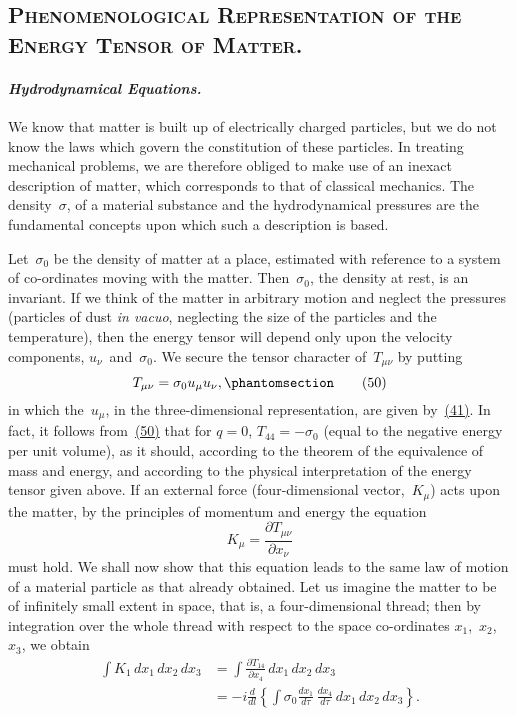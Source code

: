 \documentclass[12pt]{book}[2005/09/16]
\newcommand{\Section}[1]{%
  \subsection*{\centering\normalfont\large\textsc{#1}}
}
\newcommand{\Paragraph}[1]{\paragraph*{\indent\normalfont\itshape#1}}
\newcommand{\Change}[2]{#2}
\newcommand{\Add}[1]{\Change{}{#1}}
\newcommand{\PageSep}[1]{\ignorespaces}
\newcommand{\Tag}[1]{%
  \phantomsection
  \label{eqn:#1}
  \tag*{#1}
}
\newcommand{\Eqref}[1]{\hyperref[eqn:#1]{#1}}
\newcommand{\dd}{\partial}
\newcommand{\Vector}[1]{\mathbf{#1}}
\newcommand{\veci}{\Vector{i}}
\begin{document}
\Section{Phenomenological Representation of the
Energy Tensor of Matter.}
%

\Paragraph{Hydrodynamical Equations.} We know that matter is
%
built up of electrically charged particles, but we do not
\PageSep{57}
know the laws which govern the constitution of these
particles. In treating mechanical problems, we are therefore
obliged to make use of an inexact description of
matter, which corresponds to that of classical mechanics.
The density~$\sigma$, of a material substance and the hydrodynamical
pressures are the fundamental concepts upon
which such a description is based.

Let~$\sigma_{0}$ be the density of matter at a place, estimated
with reference to a system of co-ordinates moving with
the matter. Then~$\sigma_{0}$, the density at rest, is an invariant.
If we think of the matter in arbitrary motion and neglect
the pressures (particles of dust \textit{in vacuo}, neglecting the
size of the particles and the temperature), then the energy
tensor will depend only upon the velocity components,
$u_{\nu}$~and~$\sigma_{0}$. We secure the tensor character of~$T_{\mu\nu}$ by
putting
\[
T_{\mu\nu} = \sigma_{0} u_{\mu} u_{\nu}\Add{,}
\Tag{(50)}
\]
in which the~$u_{\mu}$, in the three-dimensional representation,
are given by~\Eqref{(41)}. In fact, it follows from~\Eqref{(50)} that for
$q = 0$, $T_{44} = -\sigma_{0}$ (equal to the negative energy per unit
volume), as it should, according to the theorem of the
equivalence of mass and energy, and according to the
physical interpretation of the energy tensor given above.
If an external force (four-dimensional vector,~$K_{\mu}$) acts
upon the matter, by the principles of momentum and
energy the equation
\[
K_{\mu} = \frac{\dd T_{\mu\nu}}{\dd x_{\nu}}
\]
\PageSep{58}
must hold. We shall now show that this equation leads
to the same law of motion of a material particle as that
already obtained. Let us imagine the matter to be of
infinitely small extent in space, that is, a four-dimensional
thread; then by integration over the whole thread with
respect to the space co-ordinates $x_{1}$,~$x_{2}$,~$x_{3}$, we obtain
\begin{align*}
\int K_{1}\, dx_{1}\, dx_{2}\, dx_{3}
  &= \int \frac{\dd T_{14}}{\dd x_{4}}\, dx_{1}\, dx_{2}\, dx_{3} \\
  &= -\Change{\veci}{i} \frac{d}{dl}\left\{
    \int \sigma_{0}\frac{dx_{1}}{d\tau}\, \frac{dx_{4}}{d\tau}\, dx_{1}\, dx_{2}\, dx_{3}
  \right\}.
\end{align*}
\end{document}
